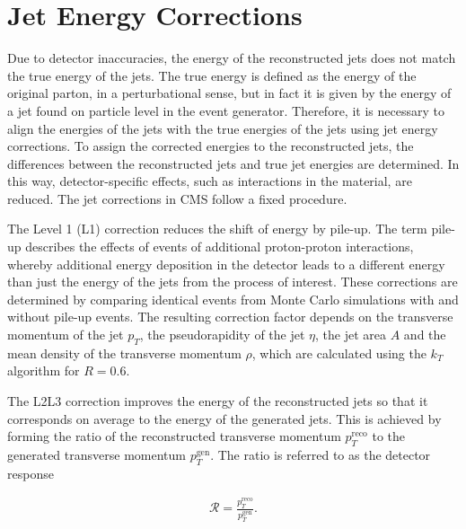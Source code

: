 \documentclass[12pt, a4paper]{thesis}
\begin{document}
\section{Jet Energy Corrections}
\label{sec:org1fc0f38}

Due to detector inaccuracies, the energy of the reconstructed jets
does not match the true energy of the jets. The true energy is defined
as the energy of the original parton, in a perturbational sense, but in
fact it is given by the energy of a jet found on particle level in the
event generator. Therefore, it is necessary to align the energies of
the jets with the true energies of the jets using jet energy
corrections. To assign the corrected energies to the reconstructed
jets, the differences between the reconstructed jets and true jet
energies are determined. In this way, detector-specific effects, such
as interactions in the material, are reduced. The jet corrections in
CMS follow a fixed procedure.

The Level 1 (L1) correction reduces the shift of energy by
pile-up. The term pile-up describes the effects of events of
additional proton-proton interactions, whereby additional energy
deposition in the detector leads to a different energy than just the
energy of the jets from the process of interest. These corrections are
determined by comparing identical events from Monte Carlo simulations
with and without pile-up events. The resulting correction factor
depends on the transverse momentum of the jet $p_T$, the pseudorapidity
of the jet $\eta$, the jet area $A$ and the mean density of the transverse
momentum $\rho$, which are calculated using the $k_T$ algorithm for $R=0.6$.

The L2L3 correction improves the energy of the reconstructed jets so
that it corresponds on average to the energy of the generated
jets. This is achieved by forming the ratio of the reconstructed
transverse momentum \(p^{\text{reco}}_T\) to the generated transverse
momentum \(p^{\text{gen}}_T\). The ratio is referred to as the
detector response

\begin{align}
  \mathcal{R} = \frac{p^{\text{reco}}_T}{p^{\text{gen}}_T}.
\end{align}
\end{document}
